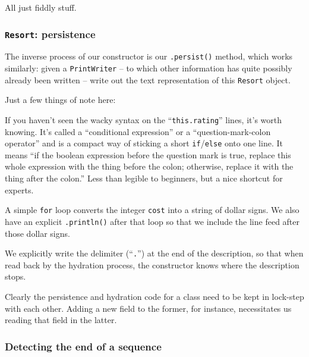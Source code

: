 All just fiddly stuff.

\subsubsection{\texttt{Resort}: persistence}

The inverse process of our constructor is our \texttt{.persist()} method,
which works similarly: given a \texttt{PrintWriter} -- to which other
information has quite possibly already been written -- write out the text
representation of this \texttt{Resort} object.

Just a few things of note here:

\begin{compactitem}

\item If you haven't seen the wacky syntax on the
``\texttt{this.rating}'' lines, it's worth knowing. It's called a ``conditional
expression'' or a ``question-mark-colon operator'' and is a compact way of
sticking a short \texttt{if}/\texttt{else} onto one line. It means ``if the
boolean expression before the question mark is true, replace this whole
expression with the thing before the colon; otherwise, replace it with the
thing after the colon.'' Less than legible to beginners, but a nice shortcut
for experts.

\item A simple \texttt{for} loop converts the integer \texttt{cost} into a
string of dollar signs. We also have an explicit \texttt{.println()} after
that loop so that we include the line feed after those dollar signs.

\item We explicitly write the delimiter (``\texttt{.}'') at the end of the
description, so that when read back by the hydration process, the constructor
knows where the description stops.

\end{compactitem}

Clearly the persistence and hydration code for a class need to be kept in
lock-step with each other. Adding a new field to the former, for instance,
necessitates us reading that field in the latter.

\subsubsection{Detecting the end of a sequence}

